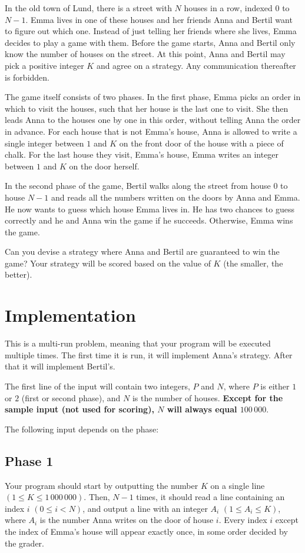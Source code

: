 In the old town of Lund, there is a street with $N$ houses in a row, indexed
$0$ to $N-1$. Emma lives in one of these houses and her friends Anna and Bertil
want to figure out which one. Instead of just telling her friends where she
lives, Emma decides to play a game with them. 
Before the game starts, Anna and Bertil only know the number of houses on the street.
At this point, Anna and Bertil may pick a positive integer $K$ and agree on a strategy.
Any communication thereafter is forbidden.

The game itself consists of two phases. In the first phase, Emma picks 
an order in which to visit the houses, such that her house is the last one to visit.
She then leads Anna to the houses one by one in this order, without telling Anna the order in advance. 
For each house that is not Emma's house, Anna is allowed to write a single integer between $1$ and $K$ 
on the front door of the house with a piece of chalk. 
For the last house they visit, Emma's house, Emma writes an integer between $1$ and $K$ on the door herself. 

In the second phase of the game, Bertil walks along the street from house $0$ to house $N-1$ and reads all the numbers written 
on the doors by Anna and Emma. He now wants to guess which house Emma lives in. 
He has two chances to guess correctly and he and Anna win the game if he succeeds. Otherwise, Emma wins the game. 


Can you devise a strategy where Anna and Bertil are guaranteed to win the game?
Your strategy will be scored based on the value of $K$ (the smaller, the better).

\section*{Implementation}
This is a multi-run problem, meaning that your program will be executed multiple times.
The first time it is run, it will implement Anna's strategy. After that it will implement Bertil's.

The first line of the input will contain two integers, $P$ and $N$, where $P$ is either $1$ or $2$ (first or second phase),
and $N$ is the number of houses.
\textbf{Except for the sample input (not used for scoring), $N$ will always equal $100\,000$}.

The following input depends on the phase:

\subsection*{Phase 1}
Your program should start by outputting the number $K$ on a single line $(1 \le K \le 1\,000\,000)$.
Then, $N - 1$ times, it should read a line containing an index $i$ $(0 \le i < N)$, and output a line with an integer
 $A_i$ $(1 \le A_i \le K)$, where $A_i$ is the number Anna writes on the door of house $i$. 
 Every index $i$ except the index of Emma's house will appear exactly once, in some order decided by the grader.

